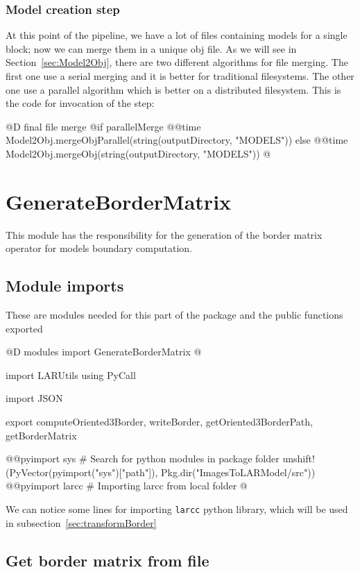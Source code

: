 \documentclass[11pt,oneside]{article}	%
\begin{document}
\subsubsection{Model creation step}\label{sec:mergeStep}

At this point of the pipeline, we have a lot of files containing models for a single block; now we can merge them in a unique obj file. As we will see in Section~\ref{sec:Model2Obj}, there are two different algorithms for file merging. The first one use a serial merging and it is better for traditional filesystems. The other one use a parallel algorithm which 
is better on a distributed filesystem. This is the code for invocation of the step:

@D final file merge
@{if parallelMerge
  @@time Model2Obj.mergeObjParallel(string(outputDirectory, "MODELS"))
else
  @@time Model2Obj.mergeObj(string(outputDirectory, "MODELS")) @}

\section{GenerateBorderMatrix}\label{sec:GenerateBorderMatrix}
This module has the responsibility for the generation of the border matrix operator for models boundary computation.

\subsection{Module imports}\label{sec:importsBorderMatrix}

These are modules needed for this part of the package and the public functions exported

@D modules import GenerateBorderMatrix
@{import LARUtils
using PyCall

import JSON

export computeOriented3Border, writeBorder, getOriented3BorderPath, getBorderMatrix

@@pyimport sys
# Search for python modules in package folder
unshift!(PyVector(pyimport("sys")["path"]), Pkg.dir("ImagesToLARModel/src"))
@@pyimport larcc # Importing larcc from local folder
@}

We can notice some lines for importing \texttt{larcc} python library, which will be used in subsection~\ref{sec:transformBorder}

\subsection{Get border matrix from file}\label{sec:getBorderMatrix}
\end{document}
